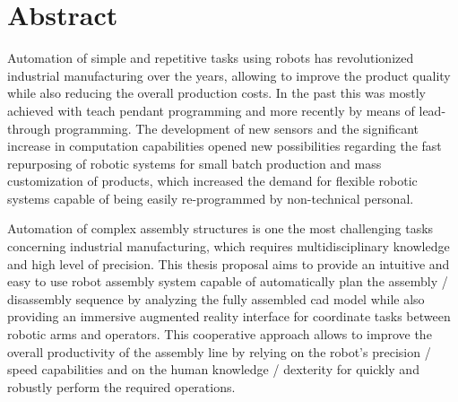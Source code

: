 \chapter*{Abstract}

Automation of simple and repetitive tasks using robots has revolutionized industrial manufacturing over the years, allowing to improve the product quality while also reducing the overall production costs. In the past this was mostly achieved with teach pendant programming and more recently by means of lead-through programming. The development of new sensors and the significant increase in computation capabilities opened new possibilities regarding the fast repurposing of robotic systems for small batch production and mass customization of products, which increased the demand for flexible robotic systems capable of being easily re-programmed by non-technical personal.

Automation of complex assembly structures is one the most challenging tasks concerning industrial manufacturing, which requires multidisciplinary knowledge and high level of precision. This thesis proposal aims to provide an intuitive and easy to use robot assembly system capable of automatically plan the assembly / disassembly sequence by analyzing the fully assembled \gls{cad} model while also providing an immersive augmented reality interface for coordinate tasks between robotic arms and operators. This cooperative approach allows to improve the overall productivity of the assembly line by relying on the robot's precision / speed capabilities and on the human knowledge / dexterity for quickly and robustly perform the required operations.
